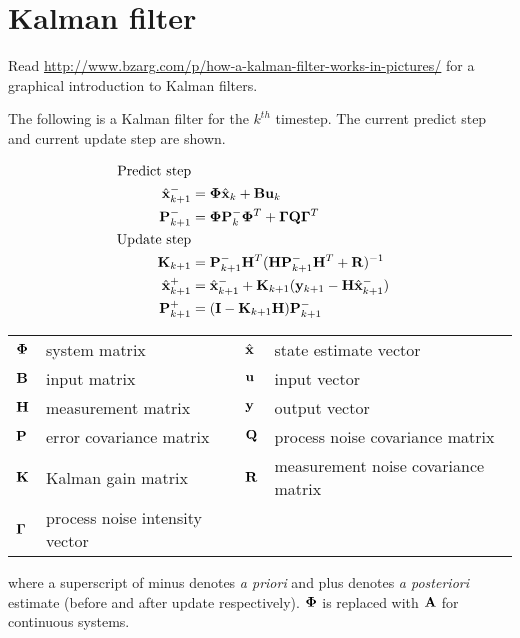 \section{Kalman filter}

Read \url{http://www.bzarg.com/p/how-a-kalman-filter-works-in-pictures/} for a
graphical introduction to Kalman filters.

The following is a Kalman filter for the $k^{th}$ timestep. The current predict
step and current update step are shown.

\begin{align}
  \text{Predict step} \nonumber \\
  \hat{\mathbf{x}}_{k+1}^- &= \mathbf{\Phi}\hat{\mathbf{x}}_k + \mathbf{B} \mathbf{u}_k
    \label{eq:pre1_x} \\
  \mathbf{P}_{k+1}^- &= \mathbf{\Phi} \mathbf{P}_k^- \mathbf{\Phi}^T +
    \mathbf{\Gamma}\mathbf{Q}\mathbf{\Gamma}^T \\
  \text{Update step} \nonumber \\
  \mathbf{K}_{k+1} &= \mathbf{P}_{k+1}^- \mathbf{H}^T (\mathbf{H}\mathbf{P}_{k+1}^- \mathbf{H}^T +
    \mathbf{R})^{-1} \\
  \hat{\mathbf{x}}_{k+1}^+ &= \hat{\mathbf{x}}_{k+1}^- + \mathbf{K}_{k+1}(\mathbf{y}_{k+1} -
    \mathbf{H} \hat{\mathbf{x}}_{k+1}^-) \label{eq:post1_x} \\
  \mathbf{P}_{k+1}^+ &= (\mathbf{I} - \mathbf{K}_{k+1}\mathbf{H})\mathbf{P}_{k+1}^-
\end{align}

\begin{center}
  \renewcommand{\arraystretch}{1.3}
  \begin{tabulary}{\linewidth}{LLLL}
    $\mathbf{\Phi}$ & system matrix & $\hat{\mathbf{x}}$ & state estimate vector \\
    $\mathbf{B}$ & input matrix            & $\mathbf{u}$ & input vector \\
    $\mathbf{H}$ & measurement matrix      & $\mathbf{y}$ & output vector \\
    $\mathbf{P}$ & error covariance matrix & $\mathbf{Q}$ & process noise covariance
      matrix \\
    $\mathbf{K}$ & Kalman gain matrix & $\mathbf{R}$ & measurement noise covariance
      matrix \\
    $\mathbf{\Gamma}$ & process noise intensity vector &
  \end{tabulary}
\end{center}

where a superscript of minus denotes \textit{a priori} and plus denotes
\textit{a posteriori} estimate (before and after update respectively).
$\mathbf{\Phi}$ is replaced with $\mathbf{A}$ for continuous systems.

